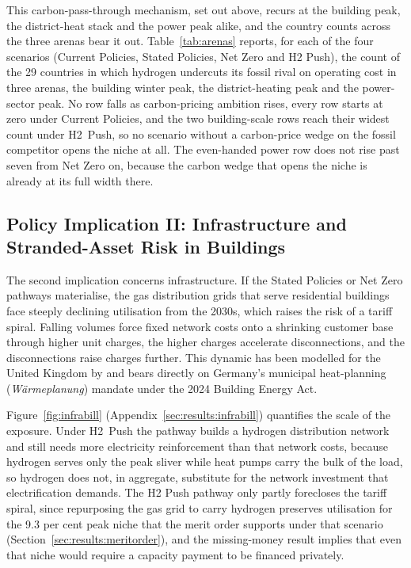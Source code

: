 This carbon-pass-through mechanism, set out above, recurs at the
building peak, the district-heat stack and the power peak alike, and the country counts
across the three arenas bear it out. Table~\ref{tab:arenas} reports, for each of
the four scenarios (Current Policies, Stated Policies, Net Zero and H2 Push), the
count of the 29 countries in which hydrogen undercuts its fossil rival on operating
cost in three arenas, the building winter peak, the district-heating peak and the
power-sector peak. No row falls as carbon-pricing ambition rises, every row starts at
zero under Current Policies, and the two building-scale rows reach their widest count
under H2~Push, so no scenario without a carbon-price wedge on the fossil competitor
opens the niche at all. The even-handed power row does not rise past seven from Net
Zero on, because the carbon wedge that opens the niche is already at its full width
there.

\subsection{Policy Implication II: Infrastructure and Stranded-Asset Risk in Buildings}

The second implication concerns infrastructure. If the Stated Policies or Net Zero
pathways materialise, the gas distribution
grids that serve residential buildings face steeply declining utilisation from
the 2030s, which raises the risk of a tariff spiral. Falling volumes force fixed
network costs onto a shrinking customer base through higher unit charges, the
higher charges accelerate disconnections, and the disconnections raise charges
further. This dynamic has been modelled for the United Kingdom by
\citet{Competition2021} and bears directly on Germany's municipal heat-planning
(\emph{W\"armeplanung}) mandate under the 2024 Building Energy Act.

Figure~\ref{fig:infrabill} (Appendix~\ref{sec:results:infrabill}) quantifies the scale
of the exposure. Under H2~Push the pathway builds a hydrogen distribution network and
still needs more electricity reinforcement than that network costs, because hydrogen
serves only the peak sliver while heat pumps carry the bulk of the load, so hydrogen
does not, in aggregate, substitute for the network investment that electrification
demands. The H2
Push pathway only partly forecloses the tariff spiral, since repurposing the gas grid to carry hydrogen preserves utilisation for the 9.3 per cent
peak niche that the merit order supports under that scenario
(Section~\ref{sec:results:meritorder}), and the missing-money result implies
that even that niche would require a capacity payment to be financed privately.

